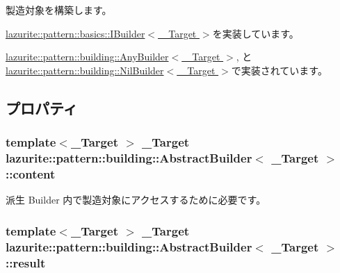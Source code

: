 製造対象を構築します。 

\hyperlink{interfacelazurite_1_1pattern_1_1basics_1_1_i_builder_3_01___target_01_4_a5013ac4acdb3873bf0c7bd34803d94e0}{lazurite::pattern::basics::IBuilder$<$ \_\-Target $>$}を実装しています。

\hyperlink{classlazurite_1_1pattern_1_1building_1_1_any_builder_3_01___target_01_4_a3c1f83ce10e846f83ab8f91d0a82300a}{lazurite::pattern::building::AnyBuilder$<$ \_\-Target $>$}, と \hyperlink{classlazurite_1_1pattern_1_1building_1_1_nil_builder_3_01___target_01_4_a569c538e03c084f2ccd3678ca368383a}{lazurite::pattern::building::NilBuilder$<$ \_\-Target $>$}で実装されています。

\subsection{プロパティ}
\hypertarget{classlazurite_1_1pattern_1_1building_1_1_abstract_builder_3_01___target_01_4_a6142f33993bb0d828922273209c1cb65}{
\subsubsection[{content}]{\setlength{\rightskip}{0pt plus 5cm}template$<$\_\-Target $>$ \_\-Target lazurite::pattern::building::AbstractBuilder$<$ \_\-Target $>$::content}}
\label{classlazurite_1_1pattern_1_1building_1_1_abstract_builder_3_01___target_01_4_a6142f33993bb0d828922273209c1cb65}


派生 Builder 内で製造対象にアクセスするために必要です。 \hypertarget{classlazurite_1_1pattern_1_1building_1_1_abstract_builder_3_01___target_01_4_a934a7ec1f51a62a61fb73998fbb2108a}{
\subsubsection[{result}]{\setlength{\rightskip}{0pt plus 5cm}template$<$\_\-Target $>$ \_\-Target lazurite::pattern::building::AbstractBuilder$<$ \_\-Target $>$::result}}
\label{classlazurite_1_1pattern_1_1building_1_1_abstract_builder_3_01___target_01_4_a934a7ec1f51a62a61fb73998fbb2108a}


